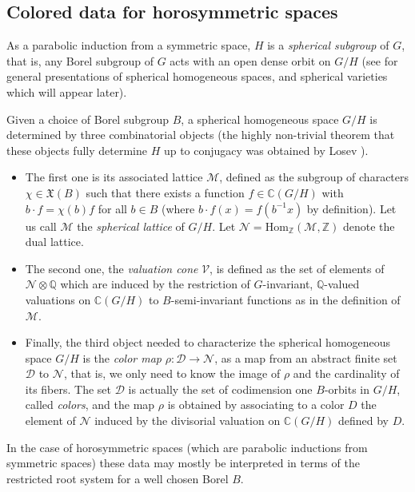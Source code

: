 \documentclass{amsart}
\theoremstyle{definition}
\begin{document}
\subsection{Colored data for horosymmetric spaces}

As a parabolic induction from a symmetric space, 
$H$ is a \emph{spherical subgroup} of $G$, that is, 
any Borel subgroup of $G$ acts with an open dense orbit on $G/H$
(see \cite{Bria,Per14,Tim11,Kno91} for general presentations 
of spherical homogeneous spaces, and spherical varieties which 
will appear later). 

Given a choice of Borel subgroup $B$, a spherical homogeneous space $G/H$
is determined by three combinatorial objects (the highly non-trivial theorem 
that these objects fully determine $H$ up to conjugacy was obtained by 
Losev \cite{Los09}). 
\begin{itemize}
\item The first one is its associated lattice $\mathcal{M}$,
defined as the subgroup of characters $\chi\in \mathfrak{X}(B)$
such that there exists a function $f\in \mathbb{C}(G/H)$ with 
$b\cdot f=\chi(b)f$ for all $b\in B$ (where $b\cdot f(x)=f(b^{-1}x)$ by definition). 
Let us call $\mathcal{M}$ 
the \emph{spherical lattice} of $G/H$. Let 
$\mathcal{N}=\mathrm{Hom}_{\mathbb{Z}}(\mathcal{M},\mathbb{Z})$
denote the dual lattice.
\item The second one, the \emph{valuation cone} $\mathcal{V}$, is defined as 
the set of elements of $\mathcal{N}\otimes \mathbb{Q}$ which 
are induced by the restriction of $G$-invariant, $\mathbb{Q}$-valued 
valuations on $\mathbb{C}(G/H)$ to $B$-semi-invariant functions 
as in the definition of $\mathcal{M}$.
\item Finally, the third object needed to characterize the spherical 
homogeneous space $G/H$ is 
the \emph{color map} $\rho : \mathcal{D} \rightarrow \mathcal{N}$,  
as a map from an abstract finite set $\mathcal{D}$ to $\mathcal{N}$, 
that is, we only need to know the image of $\rho$ and the cardinality 
of its fibers. The set $\mathcal{D}$ is actually the set of 
codimension one $B$-orbits in $G/H$, called \emph{colors}, and the map $\rho$ 
is obtained by associating to a color $D$ the element of $\mathcal{N}$ 
induced by the divisorial valuation on $\mathbb{C}(G/H)$ defined by $D$.
\end{itemize}

In the case of horosymmetric spaces (which are parabolic inductions 
from symmetric spaces) these data may mostly be interpreted 
in terms of the restricted root system for a well chosen Borel $B$.
\end{document}
